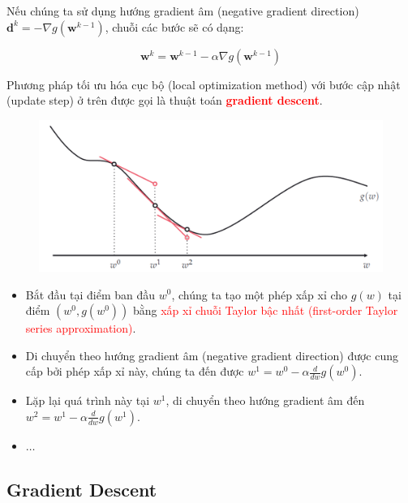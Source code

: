 \documentclass{book}
\begin{document}
Nếu chúng ta sử dụng hướng gradient âm (negative gradient direction) $\mathbf{d}^k = -\nabla g(\mathbf{w}^{k-1})$, chuỗi các bước sẽ có dạng:

\begin{equation*}
    \mathbf{w}^k =\mathbf{w}^{k-1} - \alpha\nabla g(\mathbf{w}^{k-1})
\end{equation*}

Phương pháp tối ưu hóa cục bộ (local optimization method) với bước cập nhật (update step) ở trên được gọi là thuật toán \textbf{\textcolor{red}{gradient descent}}.

\begin{figure}[H]
    \centering
    \includegraphics[width=\textwidth]{images/gradient_descent_alg.png}
\end{figure}

\begin{itemize}
    \item Bắt đầu tại điểm ban đầu $w^0$, chúng ta tạo một phép xấp xỉ cho $g(w)$ tại điểm $(w^0,g(w^0))$ bằng \textcolor{red}{xấp xỉ chuỗi Taylor bậc nhất (first-order Taylor series approximation)}.
    \item Di chuyển theo hướng gradient âm (negative gradient direction) được cung cấp bởi phép xấp xỉ này, chúng ta đến được $w^1=w^0-\alpha\frac{d}{dw}g(w^0)$.
    \item Lặp lại quá trình này tại $w^1$, di chuyển theo hướng gradient âm đến $w^2=w^1-\alpha\frac{d}{dw}g(w^1)$.
    \item $\ldots$
\end{itemize}
\subsection{Gradient Descent}
\end{document}
